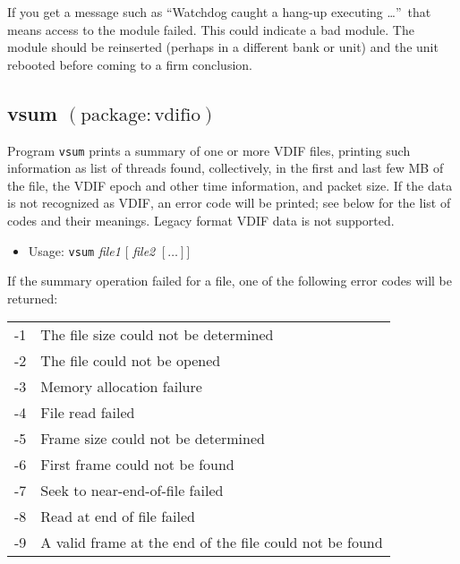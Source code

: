 If you get a message such as ``Watchdog caught a hang-up executing \ldots''\ that means access to the module failed.
This could indicate a bad module.
The module should be reinserted (perhaps in a different bank or unit) and the unit rebooted before coming to a firm conclusion.








\subsection{vsum {\small $\mathrm{(package: vdifio)}$}} \label{sec:vsum}

Program {\tt vsum} prints a summary of one or more VDIF files, printing such information as list of threads found, collectively, in the first and last few MB of the file, the VDIF epoch and other time information, and packet size.
If the data is not recognized as VDIF, an error code will be printed; see below for the list of codes and their meanings.
Legacy format VDIF data is not supported.

\begin{itemize}
\item[] Usage: {\tt vsum} {\em file1} $[$ {\em file2} $[ \ldots ] ]$
\end{itemize}

If the summary operation failed for a file, one of the following error codes will be returned:
\begin{center}
\begin{tabular}{ll}
-1 & The file size could not be determined \\
-2 & The file could not be opened \\
-3 & Memory allocation failure \\
-4 & File read failed \\
-5 & Frame size could not be determined \\
-6 & First frame could not be found \\
-7 & Seek to near-end-of-file failed \\
-8 & Read at end of file failed \\
-9 & A valid frame at the end of the file could not be found \\
\end{tabular}
\end{center}





